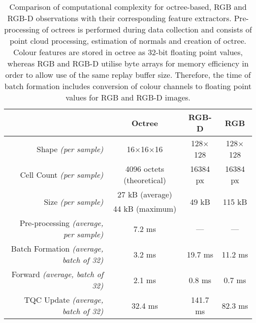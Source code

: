 \begin{table}[ht]
    \centering
    \begin{tabular}{r|ccc}
                                                        &
        \textbf{Octree}                                 & \textbf{RGB-D}             & \textbf{RGB}                                     \\ \hline
        Shape \textit{(per sample)}                & 16\(\times\)16\(\times\)16 & 128\(\times\)128       & 128\(\times\)128        \\
        Cell Count \textit{(per sample)}                & 4096 octets (theoretical)  & 16384 px               & 16384 px                \\
        \multirow{2}{*}{Size \textit{(per sample)}}     & 27 kB (average)            & \multirow{2}{*}{49 kB} & \multirow{2}{*}{115 kB} \\
                                                        & 44 kB (maximum)            &                        &                         \\ \hline
        Pre-processing \textit{(average, per sample)}   & 7.2 ms                     & ---                    & ---                     \\
        Batch Formation \textit{(average, batch of 32)} & 3.2 ms                     & 19.7 ms                & 11.2 ms                 \\
        Forward \textit{(average, batch of 32)}         & 2.1 ms                     & 0.8 ms                 & 0.7 ms                  \\
        TQC Update \textit{(average, batch of 32)}      & 32.4 ms                    & 141.7 ms               & 82.3 ms
    \end{tabular}
    \caption{Comparison of computational complexity for octree-based, RGB and RGB-D observations with their corresponding feature extractors. Pre-processing of octrees is performed during data collection and consists of point cloud processing, estimation of normals and creation of octree. Colour features are stored in octree as 32-bit floating point values, whereas RGB and RGB-D utilise byte arrays for memory efficiency in order to allow use of the same replay buffer size. Therefore, the time of batch formation includes conversion of colour channels to floating point values for RGB and RGB-D images.}
    \label{tab:feature_extractor_memory_and_computational_time}
\end{table}

\newpage

